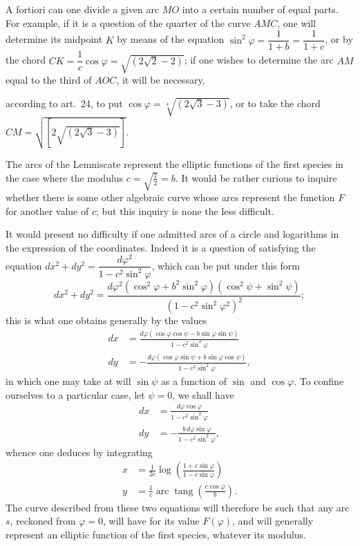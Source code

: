 \documentclass{article}
\begin{document}
A fortiori can one divide a given arc $MO$ into a certain number of equal parts. For example, if it is a question of the quarter of the curve $AMC$, one will determine its midpoint $K$ by means of the equation $\sin^{2}\varphi=\dfrac{1}{1+b}=\dfrac{1}{1+c}$, or by the chord $CK=\dfrac{1}{c}\cos\varphi=\sqrt{(2\sqrt{2}-2)}$; if one wishes to determine the arc $AM$ equal to the third of $AOC$, it will be necessary,

according to art.\ 24, to put $\cos\varphi=\sqrt[4]{(2\sqrt{3}-3)}$, or to take the chord $CM=\sqrt{[2\sqrt{(2\sqrt{3}-3)}]}$.

The arcs of the Lemniscate represent the elliptic functions of the first species in the case where the modulus $c=\sqrt{\frac{1}{2}}=b$. It would be rather curious to inquire whether there is some other algebraic curve whose arcs represent the function $F$ for another value of $c$; but this inquiry is none the less difficult.

It would present no difficulty if one admitted arcs of a circle and logarithms in the expression of the coordinates. Indeed it is a question of satisfying the equation $dx^{2}+dy^{2}=\dfrac{d\varphi^{2}}{1-c^{2}\sin^{2}\varphi}$, which can be put under this form
\[ dx^{2}+dy^{2}=\frac{d\varphi^{2}(\cos^{2}\varphi+b^{2}\sin^{2}\varphi)(\cos^{2}\psi+\sin^{2}\psi)}{(1-c^{2}\sin^{2}\varphi^{2})^{2}}; \]
this is what one obtains generally by the values
\[ \begin{aligned} dx &= \frac{d\varphi(\cos\varphi\cos\psi-b\sin\varphi\sin\psi)}{1-c^{2}\sin^{2}\varphi} \\ dy &= -\frac{d\varphi(\cos\varphi\sin\psi+b\sin\varphi\cos\psi)}{1-c^{2}\sin^{2}\varphi}, \end{aligned} \]
in which one may take at will $\sin\psi$ as a function of $\sin$ and $\cos\varphi$. To confine ourselves to a particular case, let $\psi=0$, we shall have
\[ \begin{aligned} dx &= \frac{d\varphi\cos\varphi}{1-c^{2}\sin^{2}\varphi} \\ dy &= -\frac{b\,d\varphi\sin\varphi}{1-c^{2}\sin^{2}\varphi}, \end{aligned} \]
whence one deduces by integrating
\[ \begin{aligned} x &= \frac{1}{2c}\log\left(\frac{1+c\sin\varphi}{1-c\sin\varphi}\right) \\ y &= \frac{1}{c}\operatorname{arc}\operatorname{tang}\left(\frac{c\cos\varphi}{b}\right). \end{aligned} \]
The curve described from these two equations will therefore be such that any arc $s$, reckoned from $\varphi=0$, will have for its value $F(\varphi)$, and will generally represent an elliptic function of the first species, whatever its modulus.
\end{document}
